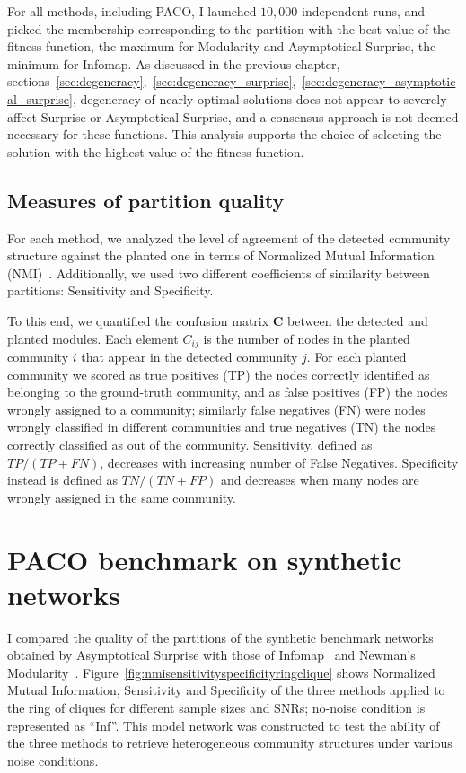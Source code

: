 For all methods, including PACO, I launched $10,000$ independent runs, and picked the membership corresponding to the partition with the best value of the fitness function, the maximum for Modularity and Asymptotical Surprise, the minimum for Infomap.
As discussed in the previous chapter, sections~\ref{sec:degeneracy},~\ref{sec:degeneracy_surprise},~\ref{sec:degeneracy_asymptotical_surprise}, degeneracy of nearly-optimal solutions does not appear to severely affect Surprise or Asymptotical Surprise, and a consensus approach is not deemed necessary for these functions.
This analysis supports the choice of selecting the solution with the highest value of the fitness function.

\subsection{Measures of partition quality}
For each method, we analyzed the level of agreement of the detected community structure against the planted one in terms of Normalized Mutual Information (NMI)~\cite{danon2005}.
Additionally, we used two different coefficients of similarity between partitions: Sensitivity and Specificity. 

To this end, we quantified the confusion matrix $\mathbf{C}$ between the detected and planted modules. Each element $C_{ij}$ is the number of nodes in the planted community $i$ that appear in the detected community $j$.
For each planted community we scored as true positives (TP) the nodes correctly identified as belonging to the ground-truth community, and as false positives (FP) the nodes wrongly assigned to a community; similarly false negatives (FN) were nodes wrongly classified in different communities and true negatives (TN) the nodes correctly classified as out of the community.
Sensitivity, defined as $TP/(TP+FN)$, decreases with increasing number of False Negatives. Specificity instead is defined as $TN/(TN+FP)$ and decreases when many nodes are wrongly assigned in the same community.

\section{PACO benchmark on synthetic networks}
I compared the quality of the partitions of the synthetic benchmark networks obtained by Asymptotical Surprise with those of Infomap~\cite{rosvall2008} and Newman's Modularity~\cite{newman2006,blondel2008}. Figure~\ref{fig:nmisensitivityspecificityringclique} shows Normalized Mutual Information, Sensitivity and Specificity of the three methods applied to the ring of cliques for different sample sizes and SNRs; no-noise condition is represented as ``Inf''.
This model network was constructed to test the ability of the three methods to retrieve heterogeneous community structures under various noise conditions.

